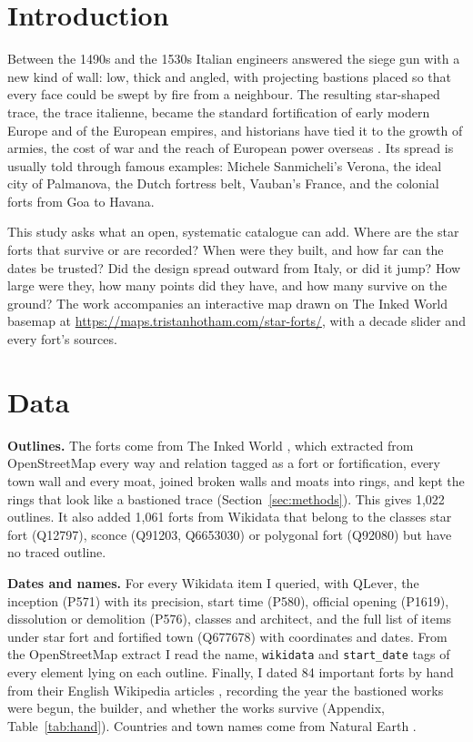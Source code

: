 \documentclass[11pt,a4paper]{article}
\begin{document}
\section{Introduction}
Between the 1490s and the 1530s Italian engineers answered the siege gun with a new kind of wall: low, thick and angled, with projecting bastions placed so that every face could be swept by fire from a neighbour. The resulting star-shaped trace, the trace italienne, became the standard fortification of early modern Europe and of the European empires, and historians have tied it to the growth of armies, the cost of war and the reach of European power overseas \citep{parker,duffy}. Its spread is usually told through famous examples: Michele Sanmicheli's Verona, the ideal city of Palmanova, the Dutch fortress belt, Vauban's France, and the colonial forts from Goa to Havana.

This study asks what an open, systematic catalogue can add. Where are the star forts that survive or are recorded? When were they built, and how far can the dates be trusted? Did the design spread outward from Italy, or did it jump? How large were they, how many points did they have, and how many survive on the ground? The work accompanies an interactive map drawn on The Inked World basemap \citep{inkmap} at \url{https://maps.tristanhotham.com/star-forts/}, with a decade slider and every fort's sources.

\section{Data}
\textbf{Outlines.} The forts come from The Inked World \citep{inkmap}, which extracted from OpenStreetMap \citep{osm} every way and relation tagged as a fort or fortification, every town wall and every moat, joined broken walls and moats into rings, and kept the rings that look like a bastioned trace (Section~\ref{sec:methods}). This gives 1,022 outlines. It also added 1,061 forts from Wikidata \citep{wikidata} that belong to the classes star fort (Q12797), sconce (Q91203, Q6653030) or polygonal fort (Q92080) but have no traced outline.

\textbf{Dates and names.} For every Wikidata item I queried, with QLever, the inception (P571) with its precision, start time (P580), official opening (P1619), dissolution or demolition (P576), classes and architect, and the full list of items under star fort and fortified town (Q677678) with coordinates and dates. From the OpenStreetMap extract I read the name, \texttt{wikidata} and \texttt{start\_date} tags of every element lying on each outline. Finally, I dated 84 important forts by hand from their English Wikipedia articles \citep{wikipedia}, recording the year the bastioned works were begun, the builder, and whether the works survive (Appendix, Table~\ref{tab:hand}). Countries and town names come from Natural Earth \citep{ne}.
\end{document}
